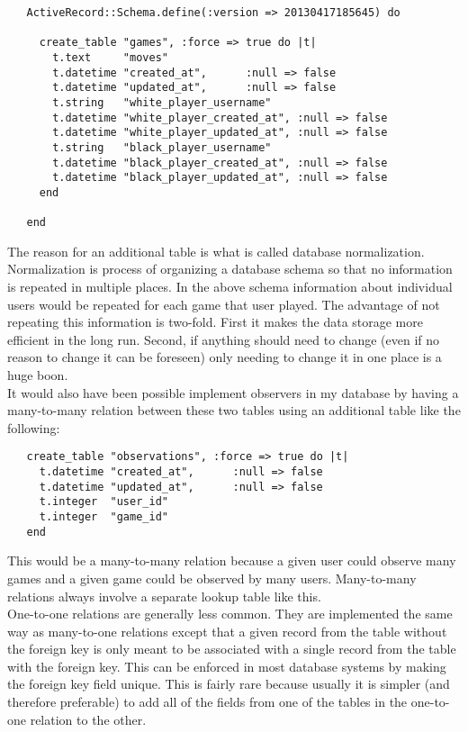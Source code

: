 \documentclass[11pt]{article}
\begin{document}
\begin{verbatim}
   ActiveRecord::Schema.define(:version => 20130417185645) do
   
     create_table "games", :force => true do |t|
       t.text     "moves"
       t.datetime "created_at",      :null => false
       t.datetime "updated_at",      :null => false
       t.string   "white_player_username"
       t.datetime "white_player_created_at", :null => false
       t.datetime "white_player_updated_at", :null => false
       t.string   "black_player_username"
       t.datetime "black_player_created_at", :null => false
       t.datetime "black_player_updated_at", :null => false
     end
   
   end
\end{verbatim}


  The reason for an additional table is what is called database
  normalization.  Normalization is process of organizing a database
  schema so that no information is repeated in multiple places.  In
  the above schema information about individual users would be
  repeated for each game that user played.  The advantage of not
  repeating this information is two-fold.  First it makes the data
  storage more efficient in the long run.  Second, if anything should
  need to change (even if no reason to change it can be foreseen) only
  needing to change it in one place is a huge boon. \\
  
  It would also have been possible implement observers in my database
  by having a many-to-many relation between these two tables using an
  additional table like the following:
  
\begin{verbatim}
   create_table "observations", :force => true do |t|
     t.datetime "created_at",      :null => false
     t.datetime "updated_at",      :null => false
     t.integer  "user_id"
     t.integer  "game_id"
   end
\end{verbatim}

  
  This would be a many-to-many relation because a given user could
  observe many games and a given game could be observed by many
  users.  Many-to-many relations always involve a separate lookup
  table like this. \\
  
  One-to-one relations are generally less common.  They are
  implemented the same way as many-to-one relations except that a
  given record from the table without the foreign key is only meant to
  be associated with a single record from the table with the foreign
  key.  This can be enforced in most database systems by making the
  foreign key field unique.  This is fairly rare because usually it is
  simpler (and therefore preferable) to add all of the fields from one
  of the tables in the one-to-one relation to the other. \\
  
\end{document}
